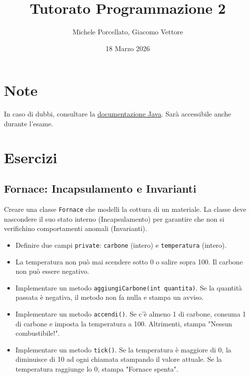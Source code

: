 \documentclass{article}
\title{Tutorato Programmazione 2 }
\author{Michele Porcellato, Giacomo Vettore}
\date{18 Marzo 2026}
\begin{document}
\maketitle

\section{Note}
In caso di dubbi, consultare la \href{https://docs.oracle.com/en/java/javase/25/docs/api/index.html}{documentazione Java}. Sarà accessibile anche durante l'esame. 
\section{Esercizi}

\subsection{Fornace: Incapsulamento e Invarianti}
Creare una classe \texttt{Fornace} che modelli la cottura di un materiale. La classe deve nascondere il suo stato interno (Incapsulamento) per garantire che non si verifichino comportamenti anomali (Invarianti).
\begin{itemize}
    \item Definire due campi \texttt{private}: \texttt{carbone} (intero) e \texttt{temperatura} (intero).
    \item La temperatura non può mai scendere sotto 0 o salire sopra 100. Il carbone non può essere negativo.
    \item Implementare un metodo \texttt{aggiungiCarbone(int quantita)}. Se la quantità passata è negativa, il metodo non fa nulla e stampa un avviso.
    \item Implementare un metodo \texttt{accendi()}. Se c'è almeno 1 di carbone, consuma 1 di carbone e imposta la temperatura a 100. Altrimenti, stampa "Nessun combustibile!".
    \item Implementare un metodo \texttt{tick()}. Se la temperatura è maggiore di 0, la diminuisce di 10 ad ogni chiamata stampando il valore attuale. Se la temperatura raggiunge lo 0, stampa "Fornace spenta".
\end{itemize}
\end{document}
